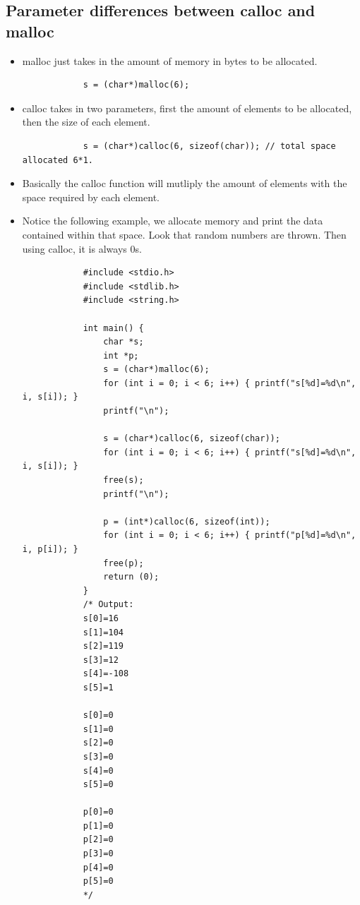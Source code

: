 \subsection{Parameter differences between calloc and malloc}
\begin{itemize}
    \item malloc just takes in the amount of memory in bytes to be allocated.
        \begin{verbatim}
            s = (char*)malloc(6);
        \end{verbatim}
    \item calloc takes in two parameters, first the amount of elements to be allocated, then the size of each element.
        \begin{verbatim}
            s = (char*)calloc(6, sizeof(char)); // total space allocated 6*1.
        \end{verbatim}
    
    \item Basically the calloc function will mutliply the amount of elements with the space required by each element.
    \item Notice the following example, we allocate memory and print the data contained within that space. Look that random numbers are thrown. Then using calloc, it is always 0s.
        \begin{verbatim}
            #include <stdio.h>
            #include <stdlib.h>
            #include <string.h>

            int main() {
                char *s;
                int *p;
                s = (char*)malloc(6);
                for (int i = 0; i < 6; i++) { printf("s[%d]=%d\n", i, s[i]); }
                printf("\n");

                s = (char*)calloc(6, sizeof(char));
                for (int i = 0; i < 6; i++) { printf("s[%d]=%d\n", i, s[i]); }
                free(s);
                printf("\n");

                p = (int*)calloc(6, sizeof(int));
                for (int i = 0; i < 6; i++) { printf("p[%d]=%d\n", i, p[i]); }
                free(p);
                return (0);
            }
            /* Output:
            s[0]=16
            s[1]=104
            s[2]=119
            s[3]=12
            s[4]=-108
            s[5]=1

            s[0]=0
            s[1]=0
            s[2]=0
            s[3]=0
            s[4]=0
            s[5]=0

            p[0]=0
            p[1]=0
            p[2]=0
            p[3]=0
            p[4]=0
            p[5]=0
            */
        \end{verbatim}
\end{itemize}

